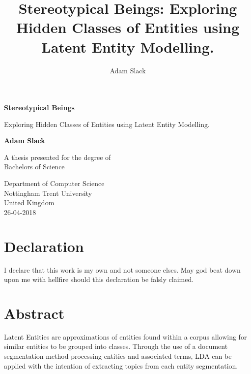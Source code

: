 \documentclass[10pt]{report}
\title{Stereotypical Beings: Exploring Hidden Classes of Entities using Latent Entity Modelling.}
\author{Adam Slack}
\date{}
\begin{document}
 
\begin{titlepage}
    \begin{center}
        \vspace*{1cm}
        
        \textbf{Stereotypical Beings}
        
        \vspace{0.5cm}
                Exploring Hidden Classes of Entities using Latent Entity Modelling.
        \vspace{1.5cm}
        
        \textbf{Adam Slack}
        
        \vfill
        
        A thesis presented for the degree of\\
        Bachelors of Science 
        
        \vspace{0.8cm}
        
        
        Department of Computer Science\\
        Nottingham Trent University\\
        United Kingdom\\
        26-04-2018
        
    \end{center}
\end{titlepage}

\section*{Declaration}

I declare that this work is my own and not someone elses. May god beat down upon me with hellfire should this declaration be falsly claimed.


\newpage
{}
\section*{Abstract}
Latent Entities are approximations of entities found within a corpus allowing for similar entities to be grouped into classes. Through the use of a document segmentation method processing entities and associated terms, LDA can be applied with the intention of extracting topics from each entity segmentation.
\end{document}
